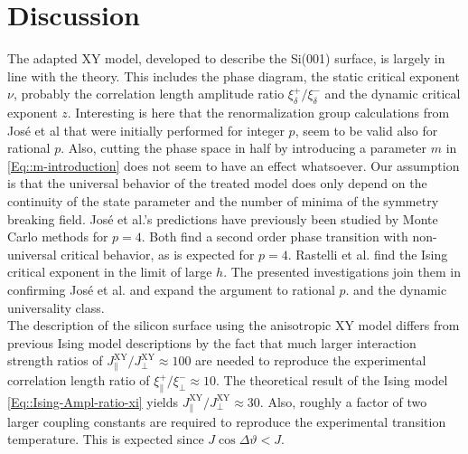 	\section{Discussion}
	The adapted XY model, developed to describe the Si(001) surface, is largely in line with the theory. This includes the phase diagram, the static critical exponent $\nu$, probably the correlation length amplitude ratio $\xi_\delta^+ /	\xi_\delta^-$ and the dynamic critical exponent $z$. Interesting is here that the renormalization group calculations from José et al \cite{jose1977renormalization} that were initially performed for integer $p$, seem to be valid also for rational $p$. Also, cutting the phase space in half by introducing a parameter $m$ in \eqref{Eq::m-introduction} does not seem to have an effect whatsoever. Our assumption is that the universal behavior of the treated model does only depend on the continuity of the state parameter and the number of minima of the symmetry breaking field. José et al.'s predictions have previously been studied by Monte Carlo methods \cite{landau1983non, rastelli2004monte} for $p=4$. Both find a second order phase transition with non-universal critical behavior, as is expected for $p=4$. Rastelli et al. \cite{rastelli2004monte} find the Ising critical exponent in the limit of large $h$. The presented investigations join them in confirming José et al. and expand the argument to rational $p$. and the dynamic universality class. \\
	
	The description of the silicon surface using the anisotropic XY model differs from previous Ising model descriptions by the fact that much larger interaction strength ratios of $J_\parallel^{\text{XY}} / J_\perp^{\text{XY}} \approx 100$ are needed to reproduce the experimental correlation length ratio of $\xi_\parallel^+ /	\xi_\perp^- \approx 10$. The theoretical result of the Ising model \eqref{Eq::Ising-Ampl-ratio-xi} yields $J_\parallel^{\text{XY}} / J_\perp^{\text{XY}} \approx 30$. Also, roughly a factor of two larger coupling constants are required to reproduce the experimental transition temperature. This is expected \cite{aizenman1980comparison} since $J \cos \Delta \vartheta < J$.\\

